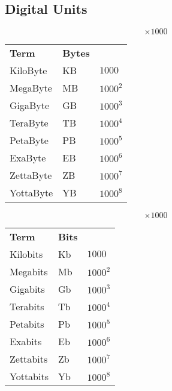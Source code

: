 \documentclass{report}
\begin{document}
        \subsection*{Digital Units}
            \begin{minipage}[t]{0.3\textwidth}
                \[\times 1000\]
                \begin{center}
                    \begin{tabular}{l l l}
                        \textbf{Term} & \textbf{Bytes} \\
                        KiloByte & KB & $1000$ \\
                        MegaByte & MB & $1000^2$ \\
                        GigaByte & GB & $1000^3$ \\
                        TeraByte & TB & $1000^4$ \\
                        PetaByte & PB & $1000^5$ \\
                        ExaByte & EB &$1000^6$ \\
                        ZettaByte & ZB & $1000^7$ \\
                        YottaByte & YB & $1000^8$ \\
                    \end{tabular}
                \end{center}
            \end{minipage}
            \hfill
            \begin{minipage}[t]{0.3\textwidth}
                \[\times 1000\]
                \begin{center}
                    \begin{tabular}{l l l}
                        \textbf{Term} & \textbf{Bits} \\
                        Kilobits  & Kb & $1000$ \\
                        Megabits  & Mb & $1000^2$ \\
                        Gigabits  & Gb & $1000^3$ \\
                        Terabits  & Tb & $1000^4$ \\
                        Petabits  & Pb & $1000^5$ \\
                        Exabits  & Eb & $1000^6$ \\
                        Zettabits & Zb & $1000^7$ \\
                        Yottabits  & Yb & $1000^8$ \\
                    \end{tabular}
                \end{center}
            \end{minipage}
\end{document}
